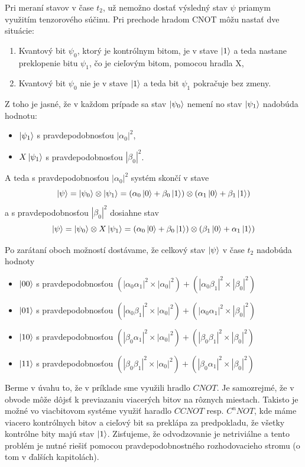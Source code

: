 Pri meraní stavov v čase \(t_2\), už nemožno dostať výsledný stav \(\psi\)
priamym využitím tenzorového súčinu. Pri prechode hradom CNOT môžu nastať
dve situácie:
\begin{enumerate}
    \item Kvantový bit \(\psi_0\), ktorý je kontrólnym bitom, je v stave 
\(\ket{1}\) a teda nastane preklopenie bitu \(\psi_1\), čo je cieľovým bitom,
pomocou hradla X,
    \item Kvantový bit \(\psi_0\) nie je v stave \(\ket{1}\) a teda bit 
\(\psi_1\) pokračuje bez zmeny.
\end{enumerate}

Z toho je jasné, že v každom prípade sa stav \(\ket{\psi_0}\) nemení no
stav \(\ket{\psi_1}\) nadobúda hodnotu:
\begin{itemize}
    \item \(\ket{\psi_1}\) s pravdepodobnosťou \(|\alpha_0|^2\),
    \item \(X\ket{\psi_1}\) s pravdepodobnosťou \(|\beta_0|^2\).
\end{itemize}

A teda s pravdepodobnosťou \(|\alpha_0|^2\) systém skončí v stave
\[\Ket{\psi} =  \Ket{\psi_0} \otimes \Ket{\psi_1} = 
(\alpha_0\ket{0} + \beta_0\ket{1}) \otimes  (\alpha_1\ket{0} + \beta_1\ket{1})
\]
a s pravdepodobnosťou \(|\beta_0|^2\) dosiahne stav
\[\Ket{\psi} =  \Ket{\psi_0} \otimes X\Ket{\psi_1} = 
(\alpha_0\ket{0} + \beta_0\ket{1}) \otimes  (\beta_1\ket{0} + \alpha_1\ket{1})
\]

Po zarátaní oboch možností dostávame, že celkový stav \(\ket{\psi}\) v čase 
\(t_2\) nadobúda hodnoty 
\begin{itemize}
    \item[] \(\ket{00}\) s pravdepodobnosťou \((|\alpha_0\alpha_1|^2 \times |\alpha_0|^2) + (|\alpha_0\beta_1|^2 \times |\beta_0|^2)\)
    \item[] \(\ket{01}\) s pravdepodobnosťou \((|\alpha_0\beta_1|^2 \times |\alpha_0|^2) + (|\alpha_0\alpha_1|^2 \times |\beta_0|^2)\)
    \item[] \(\ket{10}\) s pravdepodobnosťou \((|\beta_0\alpha_1|^2 \times |\alpha_0|^2) + (|\beta_0\beta_1|^2 \times |\beta_0|^2)\)
    \item[] \(\ket{11}\) s pravdepodobnosťou \((|\beta_0\beta_1|^2 \times |\alpha_0|^2) + (|\beta_0\alpha_1|^2 \times |\beta_0|^2)\)
\end{itemize}


Berme v úvahu to, že v príklade sme využili hradlo \(CNOT\). Je samozrejmé, že
v obvode môže dôjsť k previazaniu viacerých bitov na rôznych miestach.
Takisto je možné vo viacbitovom systéme využiť haradlo \(CCNOT\) resp. 
\(C^{n}NOT\), kde máme viacero kontrólnych bitov a cieľový bit sa preklápa
za predpokladu, že všetky kontrólne bity majú stav \(\ket{1}\).
Zisťujeme, že odvodzovanie je netriviálne a tento problém je nutné riešiť
pomocou pravdepodobnostného rozhodovacieho stromu (o tom v ďalších kapitolách).
